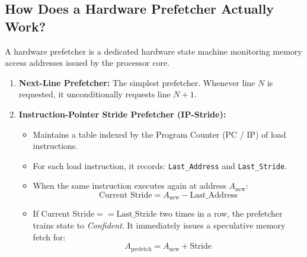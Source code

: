 \documentclass[11pt, a4paper]{article}
\begin{document}
\subsection{How Does a Hardware Prefetcher Actually Work?}
A hardware prefetcher is a dedicated hardware state machine monitoring memory access addresses issued by the processor core.
\begin{enumerate}[leftmargin=1.5em]
  \item \textbf{Next-Line Prefetcher:} The simplest prefetcher. Whenever line $N$ is requested, it unconditionally requests line $N+1$.
  \item \textbf{Instruction-Pointer Stride Prefetcher (IP-Stride):}
  \begin{itemize}
    \item Maintains a table indexed by the Program Counter (PC / IP) of load instructions.
    \item For each load instruction, it records: \texttt{Last\_Address} and \texttt{Last\_Stride}.
    \item When the same instruction executes again at address $A_{\text{new}}$:
    \begin{equation}
      \text{Current Stride} = A_{\text{new}} - \text{Last\_Address}
    \end{equation}
    \item If $\text{Current Stride} == \text{Last\_Stride}$ two times in a row, the prefetcher trains state to \textit{Confident}. It immediately issues a speculative memory fetch for:
    \begin{equation}
      A_{\text{prefetch}} = A_{\text{new}} + \text{Stride}
    \end{equation}
  \end{itemize}
\end{enumerate}
\end{document}
